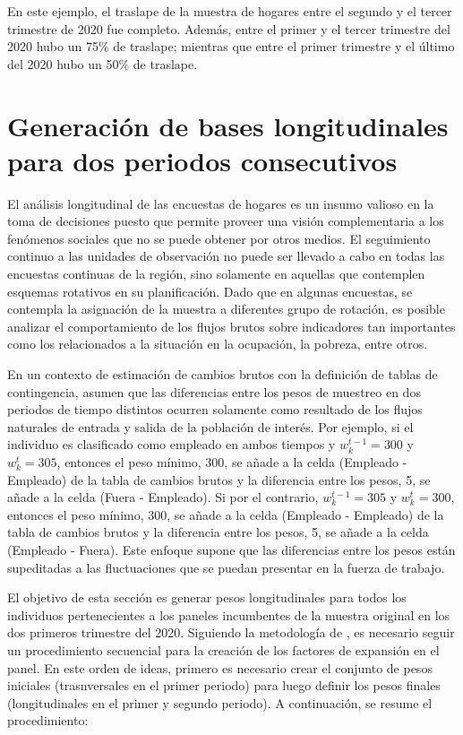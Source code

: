 \documentclass[
  12pt,
  spanish,
]{book}
\begin{document}
En este ejemplo, el traslape de la muestra de hogares entre el segundo y el tercer trimestre de 2020 fue completo. Además, entre el primer y el tercer trimestre del 2020 hubo un 75\% de traslape; mientras que entre el primer trimestre y el último del 2020 hubo un 50\% de traslape.

\hypertarget{generaciuxf3n-de-bases-longitudinales-para-dos-periodos-consecutivos}{%
\section{Generación de bases longitudinales para dos periodos consecutivos}\label{generaciuxf3n-de-bases-longitudinales-para-dos-periodos-consecutivos}}

El análisis longitudinal de las encuestas de hogares es un insumo valioso en la toma de decisiones puesto que permite proveer una visión complementaria a los fenómenos sociales que no se puede obtener por otros medios. El seguimiento continuo a las unidades de observación no puede ser llevado a cabo en todas las encuestas continuas de la región, sino solamente en aquellas que contemplen esquemas rotativos en su planificación. Dado que en algunas encuestas, se contempla la asignación de la muestra a diferentes grupo de rotación, es posible analizar el comportamiento de los flujos brutos sobre indicadores tan importantes como los relacionados a la situación en la ocupación, la pobreza, entre otros.

En un contexto de estimación de cambios brutos con la definición de tablas de contingencia, \citet{Feinberg_Stasny_1983} asumen que las diferencias entre los pesos de muestreo en dos periodos de tiempo distintos ocurren solamente como resultado de los flujos naturales de entrada y
salida de la población de interés. Por ejemplo, si el individuo es
clasificado como empleado en ambos tiempos y \(w_k^{t-1}=300\) y
\(w_k^{t}=305\), entonces el peso mínimo, 300, se añade a la celda
(Empleado - Empleado) de la tabla de cambios brutos y la diferencia
entre los pesos, 5, se añade a la celda (Fuera - Empleado). Si por el
contrario, \(w_k^{t-1}=305\) y \(w_k^{t}=300\), entonces el peso mínimo,
300, se añade a la celda (Empleado - Empleado) de la tabla de cambios
brutos y la diferencia entre los pesos, 5, se añade a la celda (Empleado
- Fuera). Este enfoque supone que las diferencias entre los pesos están
supeditadas a las fluctuaciones que se puedan presentar en la fuerza de
trabajo.

El objetivo de esta sección es generar pesos longitudinales para todos los individuos pertenecientes a los paneles incumbentes de la muestra original en los dos primeros trimestre del 2020. Siguiendo la metodología de \citet{Verma_Betti_Ghellini}, es necesario seguir un procedimiento secuencial para la creación de los factores de expansión en el panel. En este orden de ideas, primero es necesario crear el conjunto de pesos iniciales (trasnversales en el primer periodo) para luego definir los pesos finales (longitudinales en el primer y segundo periodo). A continuación, se resume el procedimiento:
\end{document}
